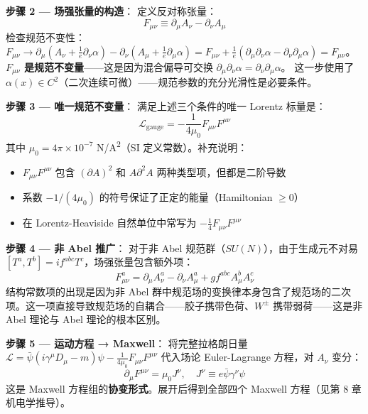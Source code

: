 \textbf{步骤 2 — 场强张量的构造}：\fbox{[S]} 定义反对称张量：
\begin{equation}
\boxed{F_{\mu\nu} \equiv \partial_\mu A_\nu - \partial_\nu A_\mu}
\end{equation}
\fbox{[S]} 检查规范不变性：$F_{\mu\nu} \to \partial_\mu(A_\nu + \frac{1}{e}\partial_\nu\alpha) - \partial_\nu(A_\mu + \frac{1}{e}\partial_\mu\alpha) = F_{\mu\nu} + \frac{1}{e}(\partial_\mu\partial_\nu\alpha - \partial_\nu\partial_\mu\alpha) = F_{\mu\nu}$。\textbf{$F_{\mu\nu}$ 是规范不变量}——这是因为混合偏导可交换 $\partial_\mu\partial_\nu\alpha = \partial_\nu\partial_\mu\alpha$。\fbox{[N]} 这一步使用了 $\alpha(x) \in C^2$（二次连续可微）——规范参数的充分光滑性是必要条件。

\textbf{步骤 3 — 唯一规范不变量}：\fbox{[S]} 满足上述三个条件的唯一 Lorentz 标量是：
\begin{equation}
\boxed{\mathcal{L}_{\text{gauge}} = -\frac{1}{4\mu_0} F_{\mu\nu}F^{\mu\nu}}
\end{equation}
其中 $\mu_0 = 4\pi \times 10^{-7}$ N/A\textsuperscript{2}（SI 定义常数）。补充说明：
\begin{itemize}
\item $F_{\mu\nu}F^{\mu\nu}$ 包含 $(\partial A)^2$ 和 $A\partial^2 A$ 两种类型项，但都是二阶导数
\item 系数 $-1/(4\mu_0)$ 的符号保证了正定的能量（Hamiltonian $\ge 0$）
\item 在 Lorentz-Heaviside 自然单位中常写为 $-\frac{1}{4}F_{\mu\nu}F^{\mu\nu}$
\end{itemize}

\textbf{步骤 4 — 非 Abel 推广}：\fbox{[S]} 对于非 Abel 规范群（$SU(N)$），由于生成元不对易 $[T^a, T^b] = if^{abc}T^c$，场强张量包含额外项：
\begin{equation}
F_{\mu\nu}^a = \partial_\mu A_\nu^a - \partial_\nu A_\mu^a + g f^{abc} A_\mu^b A_\nu^c
\end{equation}
\fbox{[N]} 结构常数项的出现是因为非 Abel 群中规范场的变换律本身包含了规范场的二次项。这一项直接导致规范场的自耦合——胶子携带色荷、$W^\pm$ 携带弱荷——这是非 Abel 理论与 Abel 理论的根本区别。

\textbf{步骤 5 — 运动方程 → Maxwell}：\fbox{[S]} 将完整拉格朗日量 $\mathcal{L} = \bar{\psi}(i\gamma^\mu D_\mu - m)\psi - \frac{1}{4\mu_0}F_{\mu\nu}F^{\mu\nu}$ 代入场论 Euler-Lagrange 方程，对 $A_\nu$ 变分：
\begin{equation}
\partial_\mu F^{\mu\nu} = \mu_0 J^\nu, \quad J^\nu \equiv e\bar{\psi}\gamma^\nu\psi
\end{equation}
这是 Maxwell 方程组的\textbf{协变形式}。展开后得到全部四个 Maxwell 方程（见第 8 章机电学推导）。

